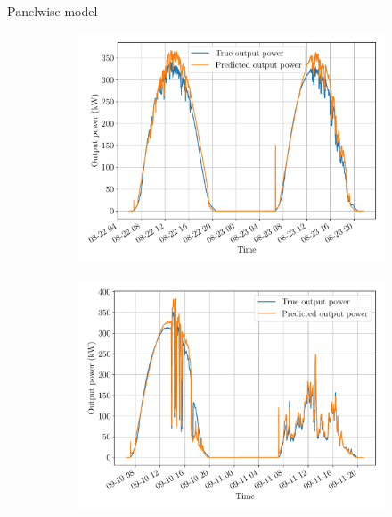 \documentclass[12pt]{beamer}
\begin{document}
\begin{frame}{Panelwise model}
    \begin{figure}
        \centering
        \begin{subfigure}{0.48\textwidth}
        \includegraphics[width=\textwidth]{resources/pdf/sart_tilman_22-08-2019.pdf}
        \end{subfigure}
        \hspace{0em}
        \begin{subfigure}{0.48\textwidth}
        \centering
        \includegraphics[width=\textwidth]{resources/pdf/sart_tilman_10-09-2019.pdf}
        \end{subfigure}
    \end{figure}
\end{frame}
\end{document}
